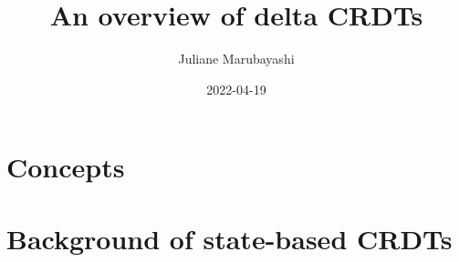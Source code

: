 \documentclass{article}
\title{An overview of delta CRDTs}
\author{Juliane Marubayashi}
\date{ 2022-04-19 }
\begin{document}
    \maketitle
    \newpage
    \tableofcontents
    \newpage
    \section{Concepts}
     
    \section{Background of state-based CRDTs}
    
       
\end{document}
